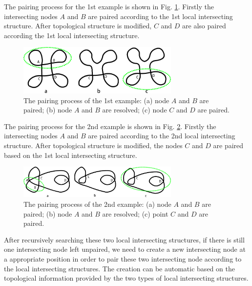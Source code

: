 \documentclass[final,5p,times,twocolumn]{elsarticle}
\begin{document}
The pairing process for the 1st example is shown in Fig. \ref{fig:pair_int_exam1_proc}. Firstly the intersecting nodes $A$ and $B$ are paired according to the 1st local intersecting structure. After topological structure is modified, $C$ and $D$ are also paired according the 1st local intersecting structure.

\begin{figure}[htbp]
\begin{center}
\includegraphics[width=8cm]{figures/pmexam1step.png}
\caption{The pairing process of the 1st example: (a) node $A$ and $B$ are paired; (b) node $A$ and $B$ are resolved; (c) node $C$ and $D$ are paired.}
\label{fig:pair_int_exam1_proc}
\end{center}
\end{figure}

The pairing process for the 2nd example is shown in Fig. \ref{fig:pair_int_exam2_proc}. Firstly the intersecting nodes $A$ and $B$ are paired according to the 2nd local intersecting structure. After topological structure is modified, the nodes $C$ and $D$ are paired based on the 1st local intersecting structure.

\begin{figure}[htbp]
\begin{center}
\includegraphics[width=8cm]{figures/pmexam2step.png}
\caption{The pairing process of the 2nd example: (a) node $A$ and $B$ are paired; (b) node $A$ and $B$ are resolved; (c) point $C$ and $D$ are paired.}
\label{fig:pair_int_exam2_proc}
\end{center}
\end{figure}

After recursively searching these two local intersecting structures, if there is still one intersecting node left unpaired, we need to create a new intersecting node at a appropriate position in order to pair these two intersecting node according to the local intersecting structures. The creation can be automatic based on the topological information provided by the two types of local intersecting structures.
\end{document}
